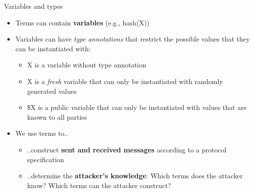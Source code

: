 \documentclass[11pt,aspectratio=169]{beamer}
\begin{document}
\begin{frame}[fragile]{Variables and types}
    \begin{itemize}
        \item Terms can contain \textbf{variables}
              (e.g., \textcolor{TermBlue}{hash(X)})
        \item Variables can have \textit{type annotations} that restrict the 
              possible values that they can be instantiated with:
        \begin{itemize}
            \item \textcolor{TermBlue}{\phantom{\tildelow}X} is a variable 
                  without type annotation
            \item \textcolor{TermBlue}{\tildelow{}X} is a \textit{fresh} 
                  variable that can only be instantiated with randomly 
                  generated values
            \item \textcolor{TermBlue}{\$X} is a public variable that can only 
                  be instantiated with values that are known to all parties
        \end{itemize}
        \item We use terms to..
        \begin{itemize}
            \item ..construct \textbf{sent and received messages} according to 
                  a protocol specification
            \item ..determine the \textbf{attacker's knowledge}: Which terms 
                  does the attacker know? Which terms can the attacker 
                  construct?
        \end{itemize}
    \end{itemize}
\end{frame}
\end{document}
